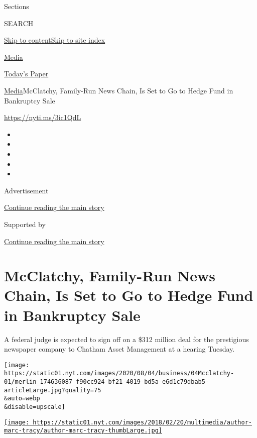 Sections

SEARCH

\protect\hyperlink{site-content}{Skip to
content}\protect\hyperlink{site-index}{Skip to site index}

\href{https://www.nytimes.com/section/business/media}{Media}

\href{https://myaccount.nytimes.com/auth/login?response_type=cookie\&client_id=vi}{}

\href{https://www.nytimes.com/section/todayspaper}{Today's Paper}

\href{/section/business/media}{Media}\textbar{}McClatchy, Family-Run
News Chain, Is Set to Go to Hedge Fund in Bankruptcy Sale

\url{https://nyti.ms/3ic1QdL}

\begin{itemize}
\item
\item
\item
\item
\item
\end{itemize}

Advertisement

\protect\hyperlink{after-top}{Continue reading the main story}

Supported by

\protect\hyperlink{after-sponsor}{Continue reading the main story}

\hypertarget{mcclatchy-family-run-news-chain-is-set-to-go-to-hedge-fund-in-bankruptcy-sale}{%
\section{McClatchy, Family-Run News Chain, Is Set to Go to Hedge Fund in
Bankruptcy
Sale}\label{mcclatchy-family-run-news-chain-is-set-to-go-to-hedge-fund-in-bankruptcy-sale}}

A federal judge is expected to sign off on a \$312 million deal for the
prestigious newspaper company to Chatham Asset Management at a hearing
Tuesday.

\texttt{[image: https://static01.nyt.com/images/2020/08/04/business/04Mcclatchy-01/merlin\_174636087\_f90cc924-bf21-4019-bd5a-e6d1c79dbab5-articleLarge.jpg?quality=75\\\&auto=webp\\\&disable=upscale]}

\href{https://www.nytimes.com/by/marc-tracy}{\texttt{[image: https://static01.nyt.com/images/2018/02/20/multimedia/author-marc-tracy/author-marc-tracy-thumbLarge.jpg]}}

